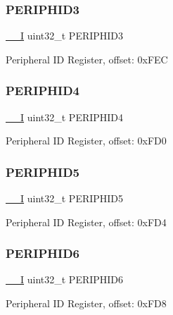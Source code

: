 \subsubsection{\texorpdfstring{PERIPHID3}{PERIPHID3}}
{\footnotesize\ttfamily \mbox{\hyperlink{core__cm0plus_8h_af63697ed9952cc71e1225efe205f6cd3}{\+\_\+\+\_\+I}} uint32\+\_\+t P\+E\+R\+I\+P\+H\+I\+D3}

Peripheral ID Register, offset\+: 0x\+F\+EC \mbox{\label{struct_r_o_m___type_a6d57dd25c691557286930237edb832ab}} 
\subsubsection{\texorpdfstring{PERIPHID4}{PERIPHID4}}
{\footnotesize\ttfamily \mbox{\hyperlink{core__cm0plus_8h_af63697ed9952cc71e1225efe205f6cd3}{\+\_\+\+\_\+I}} uint32\+\_\+t P\+E\+R\+I\+P\+H\+I\+D4}

Peripheral ID Register, offset\+: 0x\+F\+D0 \mbox{\label{struct_r_o_m___type_a97fbe48fa2f04fa8bd5f27b255d5e0ab}} 
\subsubsection{\texorpdfstring{PERIPHID5}{PERIPHID5}}
{\footnotesize\ttfamily \mbox{\hyperlink{core__cm0plus_8h_af63697ed9952cc71e1225efe205f6cd3}{\+\_\+\+\_\+I}} uint32\+\_\+t P\+E\+R\+I\+P\+H\+I\+D5}

Peripheral ID Register, offset\+: 0x\+F\+D4 \mbox{\label{struct_r_o_m___type_acd8505982b40f4478a3d82c4e0c884b4}} 
\subsubsection{\texorpdfstring{PERIPHID6}{PERIPHID6}}
{\footnotesize\ttfamily \mbox{\hyperlink{core__cm0plus_8h_af63697ed9952cc71e1225efe205f6cd3}{\+\_\+\+\_\+I}} uint32\+\_\+t P\+E\+R\+I\+P\+H\+I\+D6}

Peripheral ID Register, offset\+: 0x\+F\+D8 \mbox{\label{struct_r_o_m___type_ace00880bb4cdd91134d59cd85324c681}} 
